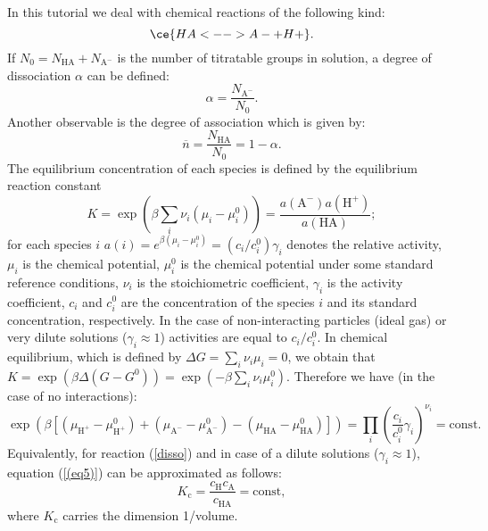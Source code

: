 \documentclass[
a4paper,                        %
11pt,                           %
twoside,                        %
footsepline,                    %
headsepline,                    %
headexclude,                    %
footexclude,                    %
pagesize,                       %
]{scrartcl}
\begin{document}
In this tutorial we deal with chemical reactions of the following kind:
\begin{equation}\label{disso}
\ce{HA <--> A- + H+}\text{.}
\end{equation}
If $N_0 = N_{\text{HA}} + N_{\text{A}^-}$ is the number of titratable groups in solution, a degree of dissociation $\alpha$ can be defined:
\begin{equation}\label{alpha}
\alpha = \frac{N_{\text{A}^-}}{N_0}.
\end{equation}
Another observable is the degree of association which is given by:
\begin{equation*}
\overline{n}=\frac{N_\text{HA}}{N_0}=1-\alpha.
\end{equation*}
The equilibrium concentration of each species is defined by the equilibrium reaction constant
\begin{equation}
K =\exp(\beta \sum_i \nu_i(\mu_i-\mu_i^0) )= \frac{a(\text{A}^-)a(\text{H}^+)}{a(\text{HA})};
\end{equation}
for each species $i$ $a(i)=e^{\beta (\mu_i-\mu_i^0)} = (c_i/c_{i}^{0})\gamma_i$ denotes the relative activity, $\mu_i$ is the chemical potential, $\mu_i^0$ is the chemical potential under some standard reference conditions, $\nu_i$ is the stoichiometric coefficient, $\gamma_i$ is the activity coefficient, $c_{i}$ and $c_{i}^{0}$ are the concentration of the species $i$ and its standard concentration, respectively. In the case of non-interacting particles (ideal gas) or very dilute solutions ($\gamma_i \approx 1$) activities are equal to $c_i/c_{i}^{0}$. In chemical equilibrium, which is defined by $\Delta G=\sum_i \nu_i \mu_i=0$, we obtain that $K=\exp(\beta \Delta (G-G^0))=\exp(-\beta \sum_i \nu_i \mu_i^0)$.
Therefore we have (in the case of no interactions):
\begin{equation}
\label{(eq5)}
\exp( \beta [ (\mu_{\text{H} ^+}- \mu_{\text{H}^+}^0)  +  (\mu_{\text{A}^-} - \mu_{\text{A}^-}^0) - (\mu_\text{HA} - \mu_\text{HA}^0) ])=
\prod_i \left( \frac{c_i}{c_i^0} \gamma_i \right)^{\nu_i} = \text{const} \text{.} 
\end{equation}
Equivalently, for reaction (\ref{disso}) and in case of a dilute solutions ($\gamma_i \approx 1$), equation (\ref{(eq5)}) can be approximated as follows:
\begin{equation}
K_{\text{c}} = \frac{c_{\text{H}}c_{\text{A}}}{c_{\text{HA}}}=\text{const},
\end{equation}
where $K_{\text{c}}$ carries the dimension 1/volume.
\end{document}
